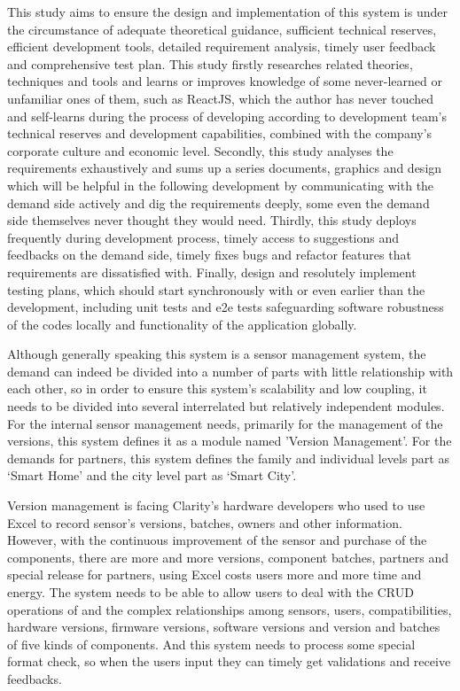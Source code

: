 This study aims to ensure the design and implementation of this system is under the circumstance of adequate theoretical guidance, sufficient technical reserves, efficient development tools, detailed requirement analysis, timely user feedback and comprehensive test plan. This study firstly researches related theories, techniques and tools and learns or improves knowledge of some never-learned or unfamiliar ones of them, such as ReactJS, which the author has never touched and self-learns during the process of developing according to development team's technical reserves and development capabilities, combined with the company's corporate culture and economic level. Secondly, this study analyses the requirements exhaustively and sums up a series documents, graphics and design which will be helpful in the following development by communicating with the demand side actively and dig the requirements deeply, some even the demand side themselves never thought they would need. Thirdly, this study deploys frequently during development process, timely access to suggestions and feedbacks on the demand side, timely fixes bugs and refactor features that requirements are dissatisfied with. Finally, design and resolutely implement testing plans, which should start synchronously with or even earlier than the development, including unit tests and e2e tests safeguarding software robustness of the codes locally and functionality of the application globally.

Although generally speaking this system is a sensor management system, the demand can indeed be divided into a number of parts with little relationship with each other, so in order to ensure this system's scalability and low coupling, it needs to be divided into several interrelated but relatively independent modules. For the internal sensor management needs, primarily for the management of the versions, this system defines it as a module named 'Version Management'. For the demands for partners, this system defines the family and individual levels part as ‘Smart Home’ and the city level part as ‘Smart City’.

Version management is facing Clarity's hardware developers who used to use Excel to record sensor's versions, batches, owners and other information. However, with the continuous improvement of the sensor and purchase of the components, there are more and more versions, component batches, partners and special release for partners, using Excel costs users more and more time and energy. The system needs to be able to allow users to deal with the CRUD operations of and the complex relationships among sensors, users, compatibilities, hardware versions, firmware versions, software versions and version and batches of five kinds of components. And this system needs to process some special format check, so when the users input they can timely get validations and receive feedbacks.

